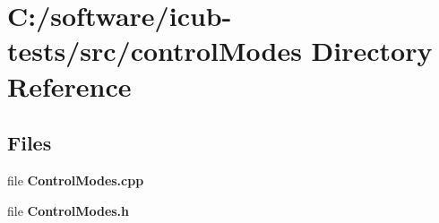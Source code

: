 \section{C\+:/software/icub-\/tests/src/control\+Modes Directory Reference}
\label{dir_67a6d6fd93427d49c4a56e9e89568513}
\subsection*{Files}
\begin{DoxyCompactItemize}
\item 
file {\bfseries Control\+Modes.\+cpp}
\item 
file {\bfseries Control\+Modes.\+h}
\end{DoxyCompactItemize}
